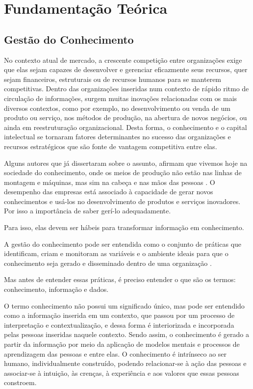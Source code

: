\section{Fundamentação Teórica}
\subsection{Gestão do Conhecimento}
No contexto atual de mercado, a crescente competição entre organizações exige que elas sejam capazes de desenvolver e gerenciar eficazmente seus recursos, quer sejam financeiros, estruturais ou de recursos humanos para se manterem competitivas. Dentro das organizações inseridas num contexto de rápido ritmo de circulação de informações, surgem muitas inovações  relacionadas com os mais diversos contextos, como por exemplo, no desenvolvimento ou venda de um produto ou serviço, nos métodos de produção, na abertura de novos negócios, ou ainda em reestruturação organizacional.  Desta forma, o conhecimento e o capital intelectual se tornaram fatores determinantes no sucesso das organizações e recursos estratégicos que são fonte de vantagem competitiva entre elas.  

Alguns autores que já dissertaram sobre o assunto, afirmam que vivemos hoje na sociedade do conhecimento, onde os meios de produção não estão nas linhas de montagem e máquinas, mas sim na cabeça e nas mãos das pessoas \cite{nonaka}. O desempenho das empresas está associado à capacidade de gerar novos conhecimentos e usá-los no desenvolvimento de produtos e serviços inovadores. Por isso a importância de saber gerí-lo adequadamente.

Para isso, elas devem ser hábeis para transformar informação em conhecimento. \cite{davenport}

A gestão do conhecimento pode ser entendida como o conjunto de práticas que identificam, criam e monitoram as variáveis e o ambiente ideais para que o conhecimento seja gerado e disseminado dentro de uma organização \cite{nonaka}. 

Mas antes de entender essas práticas, é preciso entender o que são os termos: conhecimento, informação e dados.

O termo conhecimento não possui um significado único, mas pode ser entendido como a informação inserida em um contexto, que passou por um processo de interpretação e contextualização, e dessa forma é interiorizada e incorporada pelas pessoas inseridas naquele contexto. Sendo assim, o conhecimento é gerado a partir da informação por meio da aplicação de modelos mentais e processos de aprendizagem das pessoas e entre elas. O conhecimento é intrínseco ao ser humano, individualmente construído, podendo relacionar-se à ação das pessoas e associar-se à intuição, às crenças, à experiência e aos valores que essas pessoas constroem.

